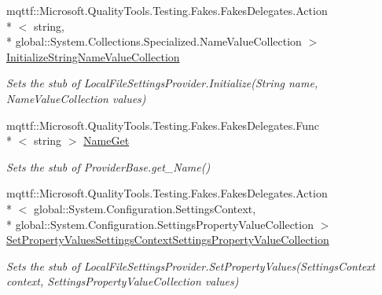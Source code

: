 \begin{DoxyCompactItemize}
mqttf\-::\-Microsoft.\-Quality\-Tools.\-Testing.\-Fakes.\-Fakes\-Delegates.\-Action\\*
$<$ string, \\*
global\-::\-System.\-Collections.\-Specialized.\-Name\-Value\-Collection $>$ \hyperlink{class_system_1_1_configuration_1_1_fakes_1_1_stub_local_file_settings_provider_a25a59166700a4425e1921f0f4e327989}{Initialize\-String\-Name\-Value\-Collection}
\begin{DoxyCompactList}\small\item\em Sets the stub of Local\-File\-Settings\-Provider.\-Initialize(\-String name, Name\-Value\-Collection values)\end{DoxyCompactList}\item 
mqttf\-::\-Microsoft.\-Quality\-Tools.\-Testing.\-Fakes.\-Fakes\-Delegates.\-Func\\*
$<$ string $>$ \hyperlink{class_system_1_1_configuration_1_1_fakes_1_1_stub_local_file_settings_provider_aa420bf64b7aa934991da261df8ff0ac3}{Name\-Get}
\begin{DoxyCompactList}\small\item\em Sets the stub of Provider\-Base.\-get\-\_\-\-Name()\end{DoxyCompactList}\item 
mqttf\-::\-Microsoft.\-Quality\-Tools.\-Testing.\-Fakes.\-Fakes\-Delegates.\-Action\\*
$<$ global\-::\-System.\-Configuration.\-Settings\-Context, \\*
global\-::\-System.\-Configuration.\-Settings\-Property\-Value\-Collection $>$ \hyperlink{class_system_1_1_configuration_1_1_fakes_1_1_stub_local_file_settings_provider_a586edf4e1391ca3f30e791f926e0eab3}{Set\-Property\-Values\-Settings\-Context\-Settings\-Property\-Value\-Collection}
\begin{DoxyCompactList}\small\item\em Sets the stub of Local\-File\-Settings\-Provider.\-Set\-Property\-Values(\-Settings\-Context context, Settings\-Property\-Value\-Collection values)\end{DoxyCompactList}\end{DoxyCompactItemize}
